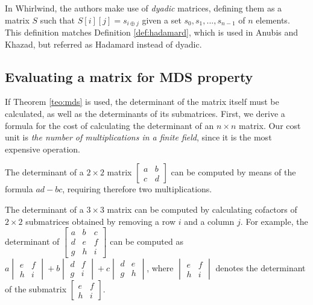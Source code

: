\documentclass{report}
\begin{document}
In Whirlwind\cite{Whirlwind2010}, the authors make use of \emph{dyadic} matrices, defining them as a matrix $S$ such that $S[i][j] = s_{i\oplus j}$ given a set $s_0, s_1, ... , s_{n-1}$ of $n$ elements. This definition matches Definition \ref{def:hadamard}, which is used in Anubis and Khazad, but referred as Hadamard instead of dyadic.

\subsection{Evaluating a matrix for MDS property}
If Theorem \ref{teo:mds} is used, the determinant of the matrix itself must be calculated, as well as the determinants of its submatrices. First, we derive a formula for the cost of calculating the determinant of an $n \times n$ matrix. Our cost unit is \emph{the number of multiplications in a finite field}, since it is the most expensive operation.

The determinant of a  $2 \times 2$ matrix $\begin{bmatrix}a & b \\ c & d\end{bmatrix}$ can be computed by means of the formula $ad - bc$, requiring therefore two multiplications.

The determinant of a $3 \times 3$ matrix can be computed by calculating cofactors of $2 \times 2$ submatrices obtained by removing a row $i$ and a column $j$. For example, the determinant of $\begin{bmatrix}a & b & c\\d & e & f\\g & h & i\end{bmatrix}$ can be computed as $a \begin{vmatrix}e & f\\h & i \end{vmatrix} + b \begin{vmatrix}d & f\\ g & i\end{vmatrix} + c \begin{vmatrix}d & e\\g & h\end{vmatrix}$, where $\begin{vmatrix}e & f\\h & i \end{vmatrix}$ denotes the determinant of the submatrix $\begin{bmatrix}e & f\\h & i \end{bmatrix}$.
\end{document}

